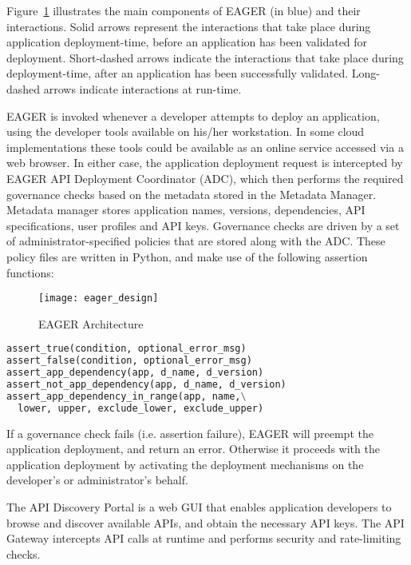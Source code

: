 Figure~\ref{fig:eager_design} illustrates the main components of EAGER (in
blue) and their interactions. Solid arrows represent the interactions that take place
during application deployment-time, before an application has been validated
for deployment. Short-dashed arrows indicate the interactions that take place
during deployment-time, after an application has been successfully validated.
Long-dashed arrows indicate interactions at run-time.

EAGER is invoked whenever a developer attempts to deploy an application, using
the developer tools available on his/her workstation. In some cloud
implementations these tools could be available as an online service accessed
via a web browser. In either case, the application deployment request is
intercepted by EAGER API Deployment Coordinator (ADC), which then performs the 
required governance checks based on the metadata stored in the Metadata Manager.
Metadata manager stores application names, versions, dependencies, API specifications,
user profiles and API keys.
Governance checks are driven by a set of administrator-specified policies that
are stored along with the ADC. These policy files are written in Python, and make use of 
the following assertion functions:

\begin{figure}
\centering
\texttt{[image: eager\_design]}
\caption{EAGER Architecture}
\label{fig:eager_design}
\end{figure}

{\footnotesize 
\begin{lstlisting}[language=Python, frame=single]
assert_true(condition, optional_error_msg)
assert_false(condition, optional_error_msg)
assert_app_dependency(app, d_name, d_version)
assert_not_app_dependency(app, d_name, d_version)
assert_app_dependency_in_range(app, name,\
  lower, upper, exclude_lower, exclude_upper)
\end{lstlisting}
}

If a governance check fails (i.e. assertion failure), EAGER will preempt the 
application deployment, and
return an error. Otherwise it proceeds with the application deployment by
activating the deployment mechanisms on the developer's or administrator's
behalf.

The API Discovery Portal is a web GUI that enables application developers to browse and
discover available APIs, and obtain the necessary API keys. The API Gateway intercepts
API calls at runtime and performs security and rate-limiting checks.